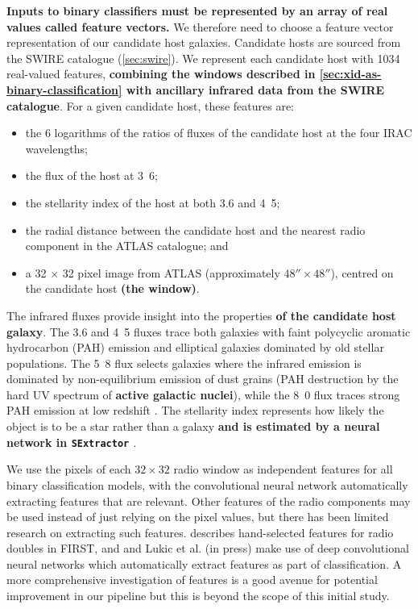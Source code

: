 \documentclass[fleqn,usenatbib,usedcolumn]{mnras}
\newcommand{\edited}[1]{{\bf {#1}}}
\begin{document}
    \edited{Inputs to binary classifiers must be represented by an array of real values called feature vectors.} We therefore need to choose a feature vector representation of our candidate host galaxies. Candidate hosts are sourced from the SWIRE catalogue (\autoref{sec:swire}). We represent each candidate host with 1034 real-valued features, \edited{combining the windows described in \autoref{sec:xid-as-binary-classification} with ancillary infrared data from the SWIRE catalogue}. For a given candidate host, these features are:
    \begin{itemize}
      \item the 6 logarithms of the ratios of fluxes of the candidate
        host at the four IRAC wavelengths;
      \item the flux of the host at \unit{3.6}{\micro\meter};
      \item the stellarity index of the host at both 3.6 and
        \unit{4.5}{\micro\meter};
      \item the radial distance between the candidate host and the nearest
        radio component in the ATLAS catalogue; and
      \item a 32 $\times$ 32 pixel image from ATLAS (approximately $48''
        \times 48''$), centred on the candidate host \edited{(the window)}.
    \end{itemize}

    The infrared fluxes provide insight into the properties \edited{of the candidate
    host galaxy}. The 3.6 and \unit{4.5}{\micro\meter} fluxes trace
    both galaxies with faint polycyclic aromatic hydrocarbon (PAH) emission
    and elliptical galaxies dominated by old stellar populations. The
    \unit{5.8}{\micro\meter} flux selects galaxies where the infrared emission
    is dominated by non-equilibrium emission of dust grains (PAH destruction
    by the hard UV spectrum of \edited{active galactic nuclei}),
    while the \unit{8.0}{\micro\meter} flux
    traces strong PAH emission at low redshift \citep{Sajina2005}. The
    stellarity index represents how likely the object is to be a star rather
    than a galaxy \citep{surace05swire} \edited{and is estimated by a neural network in
    \texttt{SExtractor} \citep{bertin96sextractor}}.

    We use the pixels of each $32 \times 32$ radio window as independent
    features for all binary classification models, with the convolutional neural
    network automatically extracting features that are relevant. Other
    features of the radio components may be used instead of just relying on the pixel values,
    but there has been limited research on extracting such features.
    \citet{proctor06} describes hand-selected features for radio doubles in
    FIRST, and \citet{aniyan17cnn} and Lukic et al. (in press) make use of
    deep convolutional neural networks which automatically extract features as
    part of classification. A more comprehensive investigation of features is
    a good avenue for potential improvement in our pipeline but this is beyond
    the scope of this initial study.
\end{document}

